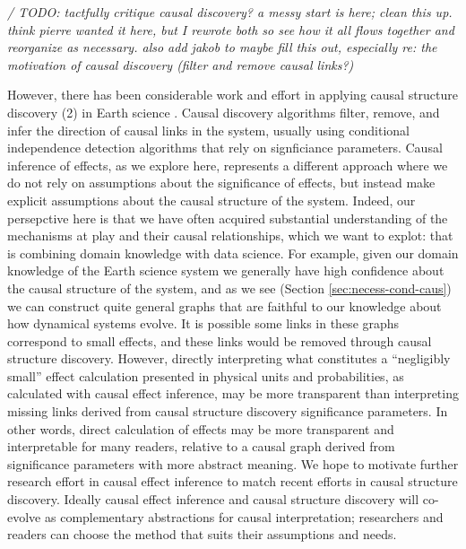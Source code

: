 \documentclass[12pt]{article}
\begin{document}
\textit{/ TODO: tactfully critique causal discovery? a messy start is
  here; clean this up. think pierre wanted it here, but I rewrote both
  so see how it all flows together and reorganize as necessary. also add
  jakob to maybe fill this out, especially re: the motivation of causal
  discovery (filter and remove causal links?)}

However, there has been considerable work and effort in applying
causal structure discovery (2) in Earth science
\citep[e.g.,][]{ebert-uphoff2012,
  samarasinghe-casuality,runge-causal-timeseries,runge2019inferring}. Causal
discovery algorithms filter, remove, and infer the direction of causal
links in the system, usually using conditional independence detection
algorithms that rely on signficiance parameters. Causal inference of
effects, as we explore here, represents a different approach where we
do not rely on assumptions about the significance of effects, but
instead make explicit assumptions about the causal structure of the
system. Indeed, our persepctive here is that we have often acquired
substantial understanding of the mechanisms at play and their causal
relationships, which we want to explot: that is combining domain
knowledge with data science. For example, given our domain knowledge
of the Earth science system we generally have high confidence about
the causal structure of the system, and as we see (Section
\ref{sec:necess-cond-caus}) we can construct quite general graphs that
are faithful to our knowledge about how dynamical systems evolve. It
is possible some links in these graphs correspond to small effects,
and these links would be removed through causal structure
discovery. However, directly interpreting what constitutes a
``negligibly small'' effect calculation presented in physical units
and probabilities, as calculated with causal effect inference, may be
more transparent than interpreting missing links derived from causal
structure discovery significance parameters. In other words, direct
calculation of effects may be more transparent and interpretable for
many readers, relative to a causal graph derived from significance
parameters with more abstract meaning. We hope to motivate further
research effort in causal effect inference to match recent efforts in
causal structure discovery. Ideally causal effect inference and causal
structure discovery will co-evolve as complementary abstractions for
causal interpretation; researchers and readers can choose the method
that suits their assumptions and needs.
\end{document}

